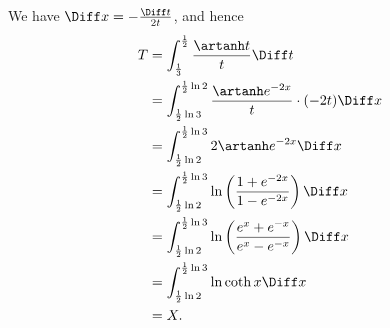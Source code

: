 \begin{itemize}
          We have \(\Diff x = - \frac{\Diff t}{2t}\), and hence
          \begin{align*}
              T & = \int_{\frac{1}{3}}^{\frac{1}{2}} \frac{\artanh t}{t} \Diff t                                                \\
                & = \int_{\frac{1}{2} \ln 3}^{\frac{1}{2} \ln 2} \frac{\artanh e^{-2x}}{t} \cdot (-2t) \Diff x                  \\
                & = \int_{\frac{1}{2} \ln 2}^{\frac{1}{2} \ln 3} 2 \artanh e^{-2x} \Diff x                                      \\
                & = \int_{\frac{1}{2} \ln 2}^{\frac{1}{2} \ln 3} \ln \left(\frac{1 + e^{-2x}}{1 - e^{-2x}}\right) \Diff x       \\
                & = \int_{\frac{1}{2} \ln 2}^{\frac{1}{2} \ln 3} \ln \left(\frac{e^{x} + e^{-x}}{e^{x} - e^{-x}}\right) \Diff x \\
                & = \int_{\frac{1}{2} \ln 2}^{\frac{1}{2} \ln 3} \ln \coth x \Diff x                                            \\
                & = X.
          \end{align*}
\end{itemize}